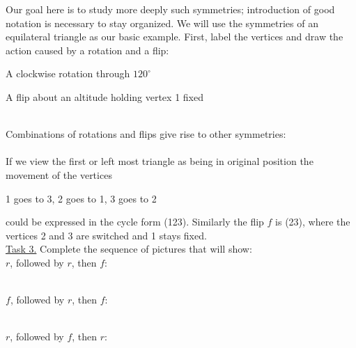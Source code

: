 \documentclass[12pt]{book}
\theoremstyle{definition}
\begin{document}
Our goal here is to study more deeply such symmetries; introduction of good notation is necessary to stay organized.  We will use the symmetries of an equilateral triangle as our basic example.  First, label the vertices and draw the action caused by a rotation and a flip:\\[.1in]
\begin{minipage}{3.25in}\def\svgwidth{2.75in}
  \end{minipage}  A clockwise rotation through $120^\circ$\\[.1in]
\begin{minipage}{3.25in}\def\svgwidth{2.75in}\end{minipage} \begin{minipage}{3.25in} A flip about an altitude holding vertex 1 fixed\end{minipage}\\[.1in]
Combinations of rotations and flips give rise to other symmetries:\\[.1in]
\def\svgwidth{6in}\\
If we view the first or left most triangle as being in original position the movement of the vertices
\centerline{1 goes to 3, 2 goes to 1, 3 goes to 2}
could be expressed in the cycle form (123).  Similarly the flip $f$ is (23), where the vertices 2 and 3 are switched and 1 stays fixed.\\[.1in]
\underline{Task 3.}  Complete the sequence of pictures that will show:\\
$r$, followed by $r$, then $f$: \begin{minipage}{3.75in}\def\svgwidth{1.75in}\end{minipage}\\[.1in]
$f$, followed by $r$, then $f$: \begin{minipage}{3.75in}\def\svgwidth{1.75in}\end{minipage}\\[.1in]
$r$, followed by $f$, then $r$: \begin{minipage}{3.75in}\def\svgwidth{1.75in}\end{minipage}\\[.1in]
\end{document}
